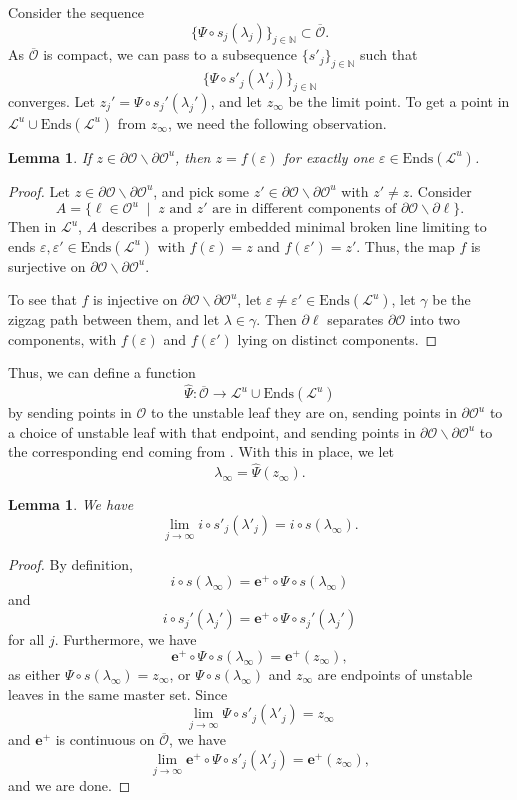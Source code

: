 \documentclass[11pt]{amsart}
\renewcommand{\l}{\lambda}
\newcommand{\mc}{\mathcal}
\newcommand{\wh}{\widehat}
\newcommand{\N}{\mathbb{N}}
\newcommand{\orb}{\mathcal{O}}
\newcommand\ssm{\smallsetminus}
\newcommand{\eplus}{\mathbf{e}^+}
\newcommand{\Ends}{\mathrm{Ends}}
\newcommand{\vep}{\varepsilon}
\numberwithin{equation}{section}
\newtheorem{lemma}[equation]{Lemma}
\theoremstyle{definition}
\begin{document}
Consider the sequence 
\[
\{\Psi\circ s_j(\l_j)\}_{j\in\N}\subset \overline{\orb}.
\]
As $\overline{\orb}$ is compact, we can pass to a subsequence $\{s'_j\}_{j\in\N}$ such that 
\[
\{\Psi\circ s'_j(\l'_j)\}_{j\in\N}
\]
converges. Let $z_j'=\Psi\circ s_j'(\l_j')$, and let $z_\infty$ be the limit point. To get a point in $\mc L^u\cup\Ends(\mc L^u)$ from $z_\infty$, we need the following observation.

\begin{lemma}\label{lem:partial_vep}
	If $z\in\partial\orb\ssm\partial\orb^u$, then $z=f(\vep)$ for exactly one $\vep\in\Ends(\mc L^u)$.
\end{lemma}

\begin{proof}
	Let $z\in\partial\orb\ssm\partial\orb^u$, and pick some $z'\in\partial\orb\ssm\partial\orb^u$ with $z'\neq z$. Consider
	\[
	A=\{\ell\in\orb^u\;\mid\;z\text{ and }z'\text{ are in different components of }\partial\orb\ssm\partial\ell\}.
	\]
	Then in $\mc L^u$, $A$ describes a properly embedded minimal broken line limiting to ends $\vep,\vep'\in \Ends(\mc L^u)$ with $f(\vep)=z$ and $f(\vep')=z'$. Thus, the map $f$ is surjective on $\partial\orb\ssm\partial\orb^u$.
	
	To see that $f$ is injective on $\partial\orb\ssm\partial\orb^u$, let $\vep\neq\vep'\in\Ends(\mc L^u)$, let $\gamma$ be the zigzag path between them, and let $\l\in\gamma$. Then $\partial\ell$ separates $\partial\orb$ into two components, with $f(\vep)$ and $f(\vep')$ lying on distinct components. 
\end{proof}

Thus, we can define a function
\[
\wh\Psi\colon\overline{\orb}\to\mc L^u\cup\Ends(\mc L^u)
\]
by sending points in $\orb$ to the unstable leaf they are on, sending points in $\partial\orb^u$ to a choice of unstable leaf with that endpoint, and sending points in $\partial\orb\ssm\partial\orb^u$ to the corresponding end coming from . With this in place, we let
\[
\l_\infty=\wh\Psi(z_\infty).
\] 

\begin{lemma}\label{lem:inf_lim}
	We have 
	\[
	\lim_{j\to\infty}i\circ s'_j(\l'_j)=i\circ s(\l_\infty).
	\]
\end{lemma}

\begin{proof}
	By definition,
	\[
	i\circ s(\l_\infty)=\eplus\circ \Psi\circ s(\l_\infty)
	\]
	and
	\[
	i\circ s_j'(\l_j')=\eplus\circ \Psi\circ s_j'(\l_j')
	\]
	for all $j$. Furthermore, we have 
	\[
	\eplus\circ \Psi\circ s(\l_\infty)=\eplus(z_\infty),
	\]
	as either $\Psi\circ s(\l_\infty)=z_\infty$, or $\Psi\circ s(\l_\infty)$ and $z_\infty$ are endpoints of unstable leaves in the same master set. Since 
	\[
	\lim_{j\to\infty}\Psi\circ s'_j(\l'_j)=z_\infty
	\]
	and $\eplus$ is continuous on $\overline{\orb}$, we have
	\[
	\lim_{j\to\infty}\eplus\circ\Psi\circ s'_j(\l'_j)=\eplus(z_\infty),
	\]
	and we are done.
\end{proof}
\end{document}
